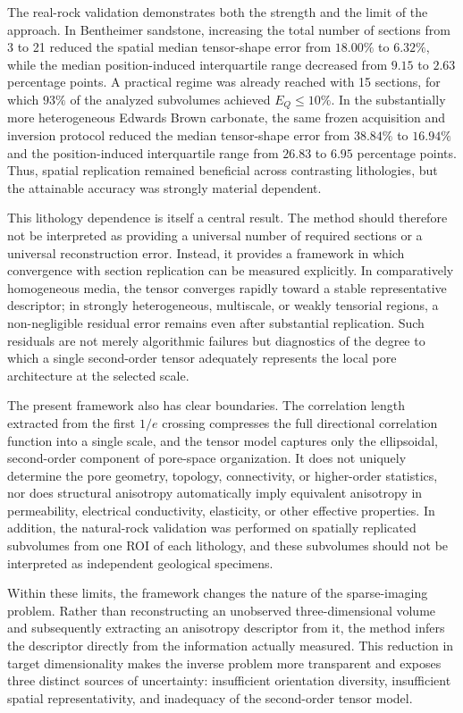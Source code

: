 \documentclass{article}
\begin{document}
The real-rock validation demonstrates both the strength and the limit of the approach. In Bentheimer sandstone, increasing the total number of sections from 3 to 21 reduced the spatial median tensor-shape error from $18.00\%$ to $6.32\%$, while the median position-induced interquartile range decreased from $9.15$ to $2.63$ percentage points. A practical regime was already reached with 15 sections, for which $93\%$ of the analyzed subvolumes achieved $E_Q \leq 10\%$. In the substantially more heterogeneous Edwards Brown carbonate, the same frozen acquisition and inversion protocol reduced the median tensor-shape error from $38.84\%$ to $16.94\%$ and the position-induced interquartile range from $26.83$ to $6.95$ percentage points. Thus, spatial replication remained beneficial across contrasting lithologies, but the attainable accuracy was strongly material dependent.

This lithology dependence is itself a central result. The method should therefore not be interpreted as providing a universal number of required sections or a universal reconstruction error. Instead, it provides a framework in which convergence with section replication can be measured explicitly. In comparatively homogeneous media, the tensor converges rapidly toward a stable representative descriptor; in strongly heterogeneous, multiscale, or weakly tensorial regions, a non-negligible residual error remains even after substantial replication. Such residuals are not merely algorithmic failures but diagnostics of the degree to which a single second-order tensor adequately represents the local pore architecture at the selected scale.

The present framework also has clear boundaries. The correlation length extracted from the first $1/e$ crossing compresses the full directional correlation function into a single scale, and the tensor model captures only the ellipsoidal, second-order component of pore-space organization. It does not uniquely determine the pore geometry, topology, connectivity, or higher-order statistics, nor does structural anisotropy automatically imply equivalent anisotropy in permeability, electrical conductivity, elasticity, or other effective properties. In addition, the natural-rock validation was performed on spatially replicated subvolumes from one ROI of each lithology, and these subvolumes should not be interpreted as independent geological specimens.

Within these limits, the framework changes the nature of the sparse-imaging problem. Rather than reconstructing an unobserved three-dimensional volume and subsequently extracting an anisotropy descriptor from it, the method infers the descriptor directly from the information actually measured. This reduction in target dimensionality makes the inverse problem more transparent and exposes three distinct sources of uncertainty: insufficient orientation diversity, insufficient spatial representativity, and inadequacy of the second-order tensor model.
\end{document}
